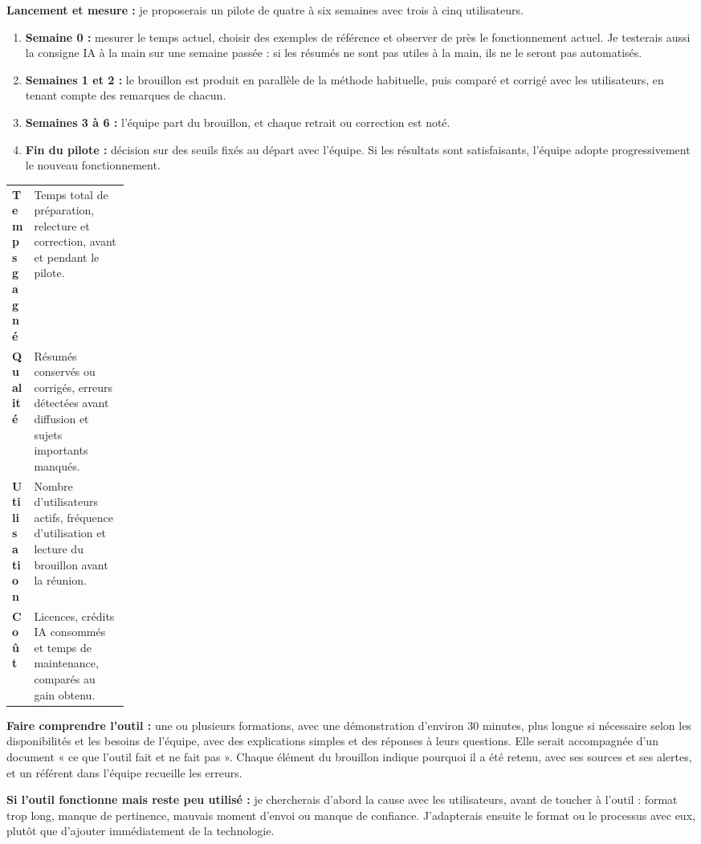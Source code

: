 \documentclass[10pt,a4paper]{article}
\newcommand{\cadre}[1]{\textbf{\color{ardoise}#1 :}}
\newcommand{\humain}[1]{\textbf{\color{amber!85!black}#1 :}}
\begin{document}
\cadre{Lancement et mesure} je proposerais un pilote de quatre à six semaines avec trois à cinq utilisateurs.
\begin{enumerate}
\item \textbf{Semaine 0 :} mesurer le temps actuel, choisir des exemples de référence et observer de près le fonctionnement actuel. Je testerais aussi la consigne IA à la main sur une semaine passée : si les résumés ne sont pas utiles à la main, ils ne le seront pas automatisés.
\item \textbf{Semaines 1 et 2 :} le brouillon est produit en parallèle de la méthode habituelle, puis comparé et corrigé avec les utilisateurs, en tenant compte des remarques de chacun.
\item \textbf{Semaines 3 à 6 :} l’équipe part du brouillon, et chaque retrait ou correction est noté.
\item \textbf{Fin du pilote :} décision sur des seuils fixés au départ avec l’équipe. Si les résultats sont satisfaisants, l’équipe adopte progressivement le nouveau fonctionnement.
\end{enumerate}

{\small
\begin{tabularx}{\linewidth}{>{\bfseries}p{0.17\linewidth}L}
\toprule
Temps gagné & Temps total de préparation, relecture et correction, avant et pendant le pilote.\\
Qualité & Résumés conservés ou corrigés, erreurs détectées avant diffusion et sujets importants manqués.\\
Utilisation & Nombre d’utilisateurs actifs, fréquence d’utilisation et lecture du brouillon avant la réunion.\\
Coût & Licences, crédits IA consommés et temps de maintenance, comparés au gain obtenu.\\
\bottomrule
\end{tabularx}}

\humain{Faire comprendre l’outil} une ou plusieurs formations, avec une démonstration d’environ 30 minutes, plus longue si nécessaire selon les disponibilités et les besoins de l’équipe, avec des explications simples et des réponses à leurs questions. Elle serait accompagnée d’un document « ce que l’outil fait et ne fait pas ». Chaque élément du brouillon indique pourquoi il a été retenu, avec ses sources et ses alertes, et un référent dans l’équipe recueille les erreurs.

\humain{Si l’outil fonctionne mais reste peu utilisé} je chercherais d’abord la cause avec les utilisateurs, avant de toucher à l’outil : format trop long, manque de pertinence, mauvais moment d’envoi ou manque de confiance. J’adapterais ensuite le format ou le processus avec eux, plutôt que d’ajouter immédiatement de la technologie.
\end{document}
